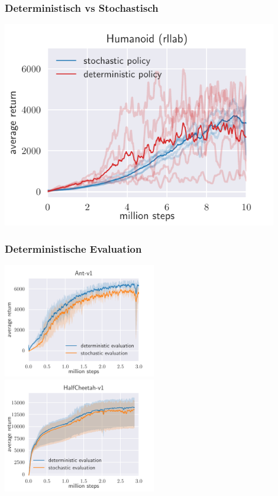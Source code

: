 \begin{frame}
	\frametitle{Deterministisch vs Stochastisch }
	\includegraphics[width=0.9\textwidth, height=0.9\textheight]{figures/seeds-humanoid-rllab.pdf}\hfill
	\cite{SAC18}
\end{frame}

\begin{frame}
	\frametitle{Deterministische Evaluation }
	\includegraphics[width=0.5\textwidth, height=0.5\textheight]{figures/evaluation-ant.pdf}\hfill
	\includegraphics[width=0.5\textwidth, height=0.5\textheight]{figures/evaluation-half-cheetah.pdf}\hfill
	\cite{SAC18}
\end{frame}

